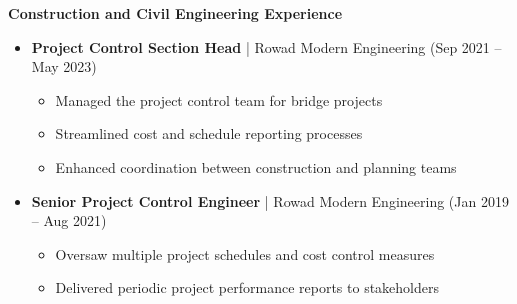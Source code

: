 \documentclass[10pt, letterpaper]{article}
\newcommand{\firstpageend}{
    \setlength{\baselineskip}{1.0\baselineskip}
}
\begin{document}
\begin{mdframed}[style=cvframe]
\begin{multicols}{2}
\textbf{\textcolor{primaryColor}{Construction and Civil Engineering Experience}}
\begin{itemize}[leftmargin=*]
    \item \textbf{Project Control Section Head} | Rowad Modern Engineering (Sep 2021 -- May 2023)
    \begin{itemize}[leftmargin=1cm]
        \item Managed the project control team for bridge projects
        \item Streamlined cost and schedule reporting processes
        \item Enhanced coordination between construction and planning teams
    \end{itemize}
    
    \item \textbf{Senior Project Control Engineer} | Rowad Modern Engineering (Jan 2019 -- Aug 2021)
    \begin{itemize}[leftmargin=1cm]
        \item Oversaw multiple project schedules and cost control measures
        \item Delivered periodic project performance reports to stakeholders
    \end{itemize}
\end{itemize}
\end{multicols}
\vspace{\baselineskip}  %
\end{mdframed}

\clearpage  %
\firstpageend  %
\end{document}
